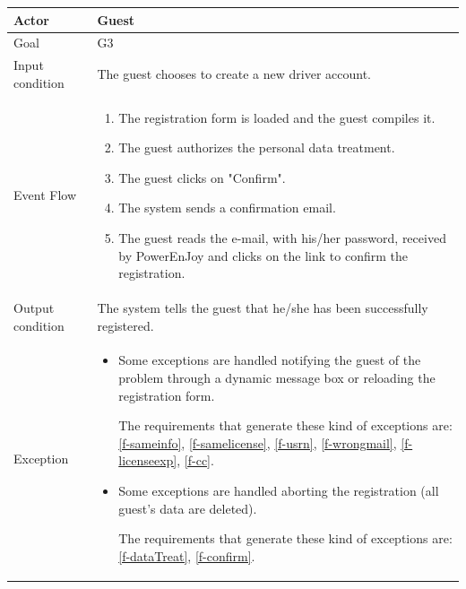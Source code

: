 
\begin{table}[H]
\begin{center}
	\begin{tabular}{| l | p{} |}
		\hline
		Actor & Guest \\
		\hline
		Goal & G3
		\\
		\hline
		Input condition & The guest chooses to create a new driver account.  \\
		\hline
		Event Flow & \begin{enumerate}
			\item The registration form is loaded and the guest compiles it.
			\item The guest authorizes the personal data treatment.
			\item The guest clicks on "Confirm".
			\item The system sends a confirmation email.
			\item The guest reads the e-mail, with his/her password, received by PowerEnJoy and clicks on the link to confirm the registration.
		\end{enumerate}
		\\
		\hline
		Output condition & The system tells the guest that he/she has been successfully registered. \\
		\hline
		
		Exception &  \begin{itemize}
			\item Some exceptions are handled notifying the guest of the problem through a dynamic message box or reloading the registration form.
			
			The requirements that generate these kind of exceptions are:
			\ref{f-sameinfo},   %
			\ref{f-samelicense}, %
			\ref{f-usrn},       %
			\ref{f-wrongmail},  %
			\ref{f-licenseexp}, %
			\ref{f-cc}.			%
			
			\item Some exceptions are handled aborting the registration (all guest's data are deleted).
			
			The requirements that generate these kind of exceptions are:
			\ref{f-dataTreat},   %
			\ref{f-confirm}.   %
		\end{itemize}
		\\
		\hline
	\end{tabular}
\end{center}
\end{table}

